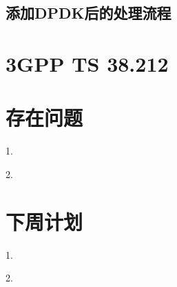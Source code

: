 \documentclass{article}
\begin{document}
\subsection{添加DPDK后的处理流程}


\section{3GPP TS 38.212}

\section{存在问题}
1. 

2. 

\section{下周计划}
1. 

2. 
\end{document}

